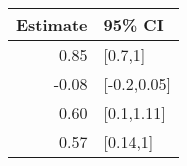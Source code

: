 \begin{tabular}{rl}
  \hline
Estimate & 95\% CI \\ 
  \hline
0.85 & [0.7,1] \\ 
  -0.08 & [-0.2,0.05] \\ 
  0.60 & [0.1,1.11] \\ 
  0.57 & [0.14,1] \\ 
   \hline
\end{tabular}

